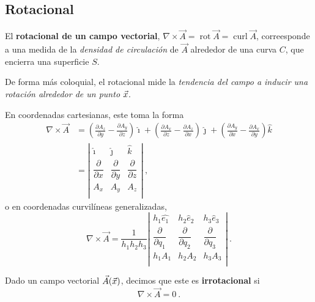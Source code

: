 \subsection{Rotacional}

\begin{defi}
    El \textbf{rotacional de un campo vectorial}, $\nabla \times \vec{A} = \operatorname{rot} \vec{A} = \operatorname{curl} \vec{A}$, correesponde a una medida de la \emph{densidad de circulación} de $\vec{A}$ alrededor de una curva $C$, que encierra una superficie $S$.

    De forma más coloquial, el rotacional mide la \emph{tendencia del campo a inducir una rotación alrededor de un punto} $\vec{x}$.
\end{defi}

En coordenadas cartesianas, este toma la forma 
\begin{align}
    \nonumber \nabla \times \vec{A} & = \left( \frac{\partial A_z}{\partial y} - \frac{\partial A_y}{\partial z} \right) \hat{\imath} + \left( \frac{\partial A_x}{\partial z} - \frac{\partial A_z}{\partial x} \right) \hat{\jmath} + \left( \frac{\partial A_y}{\partial x} - \frac{\partial A_x}{\partial y} \right) \hat{k} \\
    & = \left|
    \begin{array}{ccc}
        \hat{\imath} & \hat{\jmath} & \hat{k} \\
        \dfrac{\partial}{\partial x} & \dfrac{\partial}{\partial y} & \dfrac{\partial}{\partial z} \\
        A_x & A_y & A_z \\
    \end{array}
    \right| \ ,
\end{align}
o en coordenadas curvilíneas generalizadas,
\begin{equation}
    \nabla \times \vec{A} = \frac{1}{h_1 h_2 h_3} \left| 
    \begin{array}{ccc}
        h_1 \hat{e_1} & h_2 \hat{e}_2 & h_3 \hat{e}_3 \\
        \dfrac{\partial}{\partial q_1} & \dfrac{\partial}{\partial q_2} & \dfrac{\partial}{\partial q_3} \\
        h_1 A_1 & h_2 A_2 & h_3 A_3 \\
    \end{array}
    \right| \ .
\end{equation}

\begin{defi}
    Dado un campo vectorial $\vec{A}(\vec{x})$, decimos que este es \textbf{irrotacional} si 
    \begin{equation}
        \nabla \times \vec{A} = 0 \ .
    \end{equation}
\end{defi}

